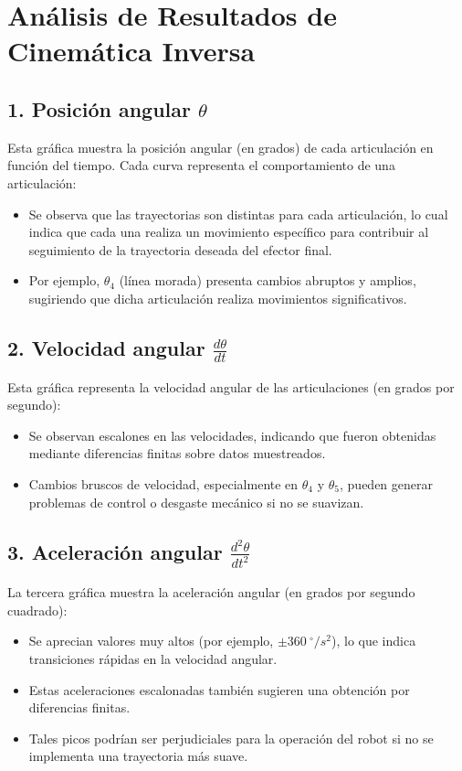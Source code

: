 \newpage
\section*{Análisis de Resultados de Cinemática Inversa}


\subsection*{1. Posición angular $\theta$}
Esta gráfica muestra la posición angular (en grados) de cada articulación en función del tiempo. Cada curva representa el comportamiento de una articulación:


\begin{itemize}
	\item Se observa que las trayectorias son distintas para cada articulación, lo cual indica que cada una realiza un movimiento específico para contribuir al seguimiento de la trayectoria deseada del efector final.
	\item Por ejemplo, $\theta_4$ (línea morada) presenta cambios abruptos y amplios, sugiriendo que dicha articulación realiza movimientos significativos.
\end{itemize}


\subsection*{2. Velocidad angular $\frac{d\theta}{dt}$}

Esta gráfica representa la velocidad angular de las articulaciones (en grados por segundo):


\begin{itemize}
	\item Se observan escalones en las velocidades, indicando que fueron obtenidas mediante diferencias finitas sobre datos muestreados.
	\item Cambios bruscos de velocidad, especialmente en $\theta_4$ y $\theta_5$, pueden generar problemas de control o desgaste mecánico si no se suavizan.
\end{itemize}


\subsection*{3. Aceleración angular $\frac{d^2\theta}{dt^2}$}
La tercera gráfica muestra la aceleración angular (en grados por segundo cuadrado):


\begin{itemize}
	\item Se aprecian valores muy altos (por ejemplo, $\pm 360~^\circ/s^2$), lo que indica transiciones rápidas en la velocidad angular.
	\item Estas aceleraciones escalonadas también sugieren una obtención por diferencias finitas.
	\item Tales picos podrían ser perjudiciales para la operación del robot si no se implementa una trayectoria más suave.
\end{itemize}


